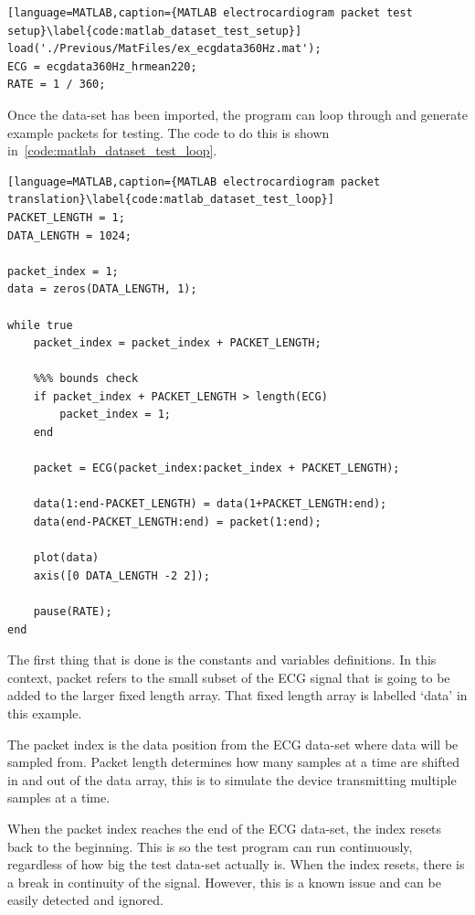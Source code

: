 \begin{lstlisting}[language=MATLAB,caption={MATLAB electrocardiogram packet test setup}\label{code:matlab_dataset_test_setup}]
load('./Previous/MatFiles/ex_ecgdata360Hz.mat');
ECG = ecgdata360Hz_hrmean220;
RATE = 1 / 360;
\end{lstlisting}

Once the data-set has been imported, the program can loop through and generate example packets for testing.
The code to do this is shown in~\autoref{code:matlab_dataset_test_loop}.

\begin{lstlisting}[language=MATLAB,caption={MATLAB electrocardiogram packet translation}\label{code:matlab_dataset_test_loop}]
PACKET_LENGTH = 1;
DATA_LENGTH = 1024;

packet_index = 1;
data = zeros(DATA_LENGTH, 1);

while true
    packet_index = packet_index + PACKET_LENGTH;

    %%% bounds check
    if packet_index + PACKET_LENGTH > length(ECG)
        packet_index = 1;
    end

    packet = ECG(packet_index:packet_index + PACKET_LENGTH);

    data(1:end-PACKET_LENGTH) = data(1+PACKET_LENGTH:end);
    data(end-PACKET_LENGTH:end) = packet(1:end);

    plot(data)
    axis([0 DATA_LENGTH -2 2]);

    pause(RATE);
end
\end{lstlisting}

The first thing that is done is the constants and variables definitions.
In this context, packet refers to the small subset of the ECG signal that is going to be added to the larger fixed length array.
That fixed length array is labelled `data' in this example.

The packet index is the data position from the ECG data-set where data will be sampled from.
Packet length determines how many samples at a time are shifted in and out of the data array,
this is to simulate the device transmitting multiple samples at a time.

When the packet index reaches the end of the ECG data-set, the index resets back to the beginning.
This is so the test program can run continuously, regardless of how big the test data-set actually is.
When the index resets, there is a break in continuity of the signal. However, this is a known issue and can be easily detected and ignored.

